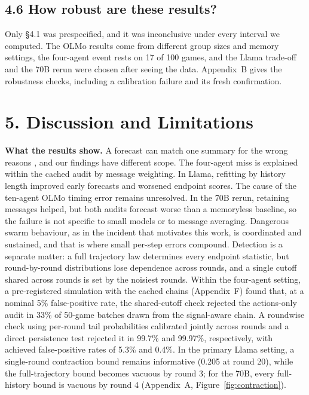 \documentclass[11pt,letterpaper]{article}
\begin{document}
\subsection{4.6 How robust are these results?}

Only §4.1 was prespecified, and it was inconclusive under every interval we computed.
The OLMo results come from different group sizes and memory settings, the four-agent event rests on 17 of 100 games, and the Llama trade-off and the 70B rerun were chosen after seeing the data.
Appendix~B gives the robustness checks, including a calibration failure and its fresh confirmation.

\section{5. Discussion and Limitations}

\textbf{What the results show.}
A forecast can match one summary for the wrong reasons \citep{kirchner2006,hourdin2017}, and our findings have different scope.
The four-agent miss is explained within the cached audit by message weighting.
In Llama, refitting by history length improved early forecasts and worsened endpoint scores.
The cause of the ten-agent OLMo timing error remains unresolved.
In the 70B rerun, retaining messages helped, but both audits forecast worse than a memoryless baseline, so the failure is not specific to small models or to message averaging.
Dangerous swarm behaviour, as in the incident that motivates this work, is coordinated and sustained, and that is where small per-step errors compound.
Detection is a separate matter: a full trajectory law determines every endpoint statistic, but round-by-round distributions lose dependence across rounds, and a single cutoff shared across rounds is set by the noisiest rounds.
Within the four-agent setting, a pre-registered simulation with the cached chains (Appendix~F) found that, at a nominal 5\% false-positive rate, the shared-cutoff check rejected the actions-only audit in 33\% of 50-game batches drawn from the signal-aware chain. A roundwise check using per-round tail probabilities calibrated jointly across rounds and a direct persistence test rejected it in 99.7\% and 99.97\%, respectively, with achieved false-positive rates of 5.3\% and 0.4\%.
In the primary Llama setting, a single-round contraction bound remains informative (0.205 at round 20), while the full-trajectory bound becomes vacuous by round 3; for the 70B, every full-history bound is vacuous by round 4 (Appendix~A, Figure~\ref{fig:contraction}).
\end{document}

